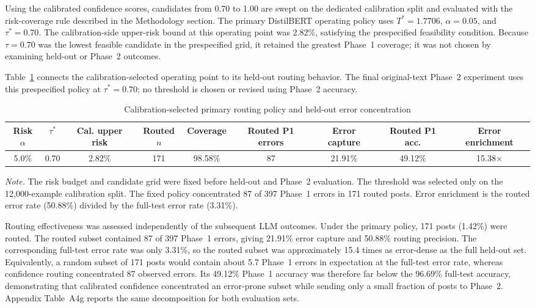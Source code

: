 \documentclass{ieeeaccess}
\begin{document}
Using the calibrated confidence scores, candidates from 0.70 to 1.00 are swept on the dedicated calibration split and evaluated with the risk-coverage rule described in the Methodology section. The primary DistilBERT operating policy uses $T^*=1.7706$, $\alpha=0.05$, and $\tau^*=0.70$. The calibration-side upper-risk bound at this operating point was 2.82\%, satisfying the prespecified feasibility condition. Because $\tau=0.70$ was the lowest feasible candidate in the prespecified grid, it retained the greatest Phase~1 coverage; it was not chosen by examining held-out or Phase~2 outcomes.

Table~\ref{tab:routing-policy} connects the calibration-selected operating point to its held-out routing behavior. The final original-text Phase~2 experiment uses this prespecified policy at $\tau^*=0.70$; no threshold is chosen or revised using Phase~2 accuracy.

\begin{table}[t]
\centering
\caption{Calibration-selected primary routing policy and held-out error concentration}
\label{tab:routing-policy}
\scriptsize
\setlength{\tabcolsep}{2.2pt}
\renewcommand{\arraystretch}{1.18}
\begin{tabularx}{\textwidth}{@{}c c c c c c c c c@{}}
\toprule
Risk $\alpha$ & $\tau^*$ & Cal. upper risk & Routed $n$ & Coverage & Routed P1 errors & Error capture & Routed P1 acc. & Error enrichment \\
\midrule
5.0\% & 0.70 & 2.82\% & 171 & 98.58\% & 87 & 21.91\% & 49.12\% & 15.38$\times$ \\
\bottomrule
\end{tabularx}
\vspace{2pt}
\parbox{\textwidth}{\footnotesize \textit{Note.} The risk budget and candidate grid were fixed before held-out and Phase~2 evaluation. The threshold was selected only on the 12,000-example calibration split. The fixed policy concentrated 87 of 397 Phase~1 errors in 171 routed posts. Error enrichment is the routed error rate (50.88\%) divided by the full-test error rate (3.31\%).}
\end{table}

Routing effectiveness was assessed independently of the subsequent LLM outcomes. Under the primary policy, 171 posts (1.42\%) were routed. The routed subset contained 87 of 397 Phase~1 errors, giving 21.91\% error capture and 50.88\% routing precision. The corresponding full-test error rate was only 3.31\%, so the routed subset was approximately 15.4 times as error-dense as the full held-out set. Equivalently, a random subset of 171 posts would contain about 5.7 Phase~1 errors in expectation at the full-test error rate, whereas confidence routing concentrated 87 observed errors. Its 49.12\% Phase~1 accuracy was therefore far below the 96.69\% full-test accuracy, demonstrating that calibrated confidence concentrated an error-prone subset while sending only a small fraction of posts to Phase~2. Appendix Table~A4g reports the same decomposition for both evaluation sets.
\end{document}
